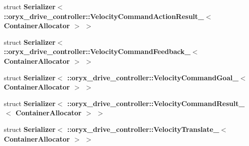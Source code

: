 \begin{DoxyCompactItemize}
struct {\bf \-Serializer$<$ \-::oryx\-\_\-drive\-\_\-controller\-::\-Velocity\-Command\-Action\-Result\-\_\-$<$ Container\-Allocator $>$ $>$}
\item 
struct {\bf \-Serializer$<$ \-::oryx\-\_\-drive\-\_\-controller\-::\-Velocity\-Command\-Feedback\-\_\-$<$ Container\-Allocator $>$ $>$}
\item 
struct {\bf \-Serializer$<$ \-::oryx\-\_\-drive\-\_\-controller\-::\-Velocity\-Command\-Goal\-\_\-$<$ Container\-Allocator $>$ $>$}
\item 
struct {\bf \-Serializer$<$ \-::oryx\-\_\-drive\-\_\-controller\-::\-Velocity\-Command\-Result\-\_\-$<$ Container\-Allocator $>$ $>$}
\item 
struct {\bf \-Serializer$<$ \-::oryx\-\_\-drive\-\_\-controller\-::\-Velocity\-Translate\-\_\-$<$ Container\-Allocator $>$ $>$}
\end{DoxyCompactItemize}
